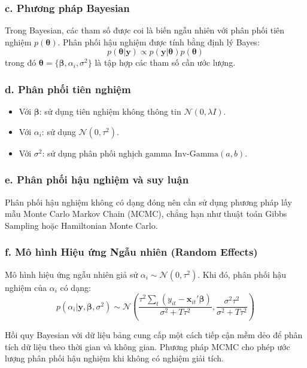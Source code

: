 \subsubsection{c. Phương pháp Bayesian}
Trong Bayesian, các tham số được coi là biến ngẫu nhiên với phân phối tiên nghiệm $p(\boldsymbol{\theta})$. Phân phối hậu nghiệm được tính bằng định lý Bayes:
\begin{equation}
    p(\boldsymbol{\theta} | \mathbf{y}) \propto p(\mathbf{y} | \boldsymbol{\theta}) p(\boldsymbol{\theta})
\end{equation}
trong đó $\boldsymbol{\theta} = \{\boldsymbol{\beta}, \alpha_i, \sigma^2\}$ là tập hợp các tham số cần ước lượng.

\subsubsection{d. Phân phối tiên nghiệm}
\begin{itemize}
    \item Với $\boldsymbol{\beta}$: sử dụng tiên nghiệm không thông tin $\mathcal{N}(0, \lambda I)$. 
    \item Với $\alpha_i$: sử dụng $\mathcal{N}(0, \tau^2)$. 
    \item Với $\sigma^2$: sử dụng phân phối nghịch gamma $\text{Inv-Gamma}(a, b)$.
\end{itemize}

\subsubsection{e. Phân phối hậu nghiệm và suy luận}
Phân phối hậu nghiệm không có dạng đóng nên cần sử dụng phương pháp lấy mẫu Monte Carlo Markov Chain (MCMC), chẳng hạn như thuật toán Gibbs Sampling hoặc Hamiltonian Monte Carlo.

\subsubsection{f. Mô hình Hiệu ứng Ngẫu nhiên (Random Effects)}
Mô hình hiệu ứng ngẫu nhiên giả sử $\alpha_i \sim \mathcal{N}(0, \tau^2)$. Khi đó, phân phối hậu nghiệm của $\alpha_i$ có dạng:
\begin{equation}
    p(\alpha_i | \mathbf{y}, \boldsymbol{\beta}, \sigma^2) \sim \mathcal{N}\left( \frac{\tau^2 \sum_t (y_{it} - \mathbf{x}_{it}'\boldsymbol{\beta})}{\sigma^2 + T \tau^2}, \frac{\sigma^2 \tau^2}{\sigma^2 + T \tau^2} \right)
\end{equation}


Hồi quy Bayesian với dữ liệu bảng cung cấp một cách tiếp cận mềm dẻo để phân tích dữ liệu theo thời gian và không gian. Phương pháp MCMC cho phép ước lượng phân phối hậu nghiệm khi không có nghiệm giải tích.

